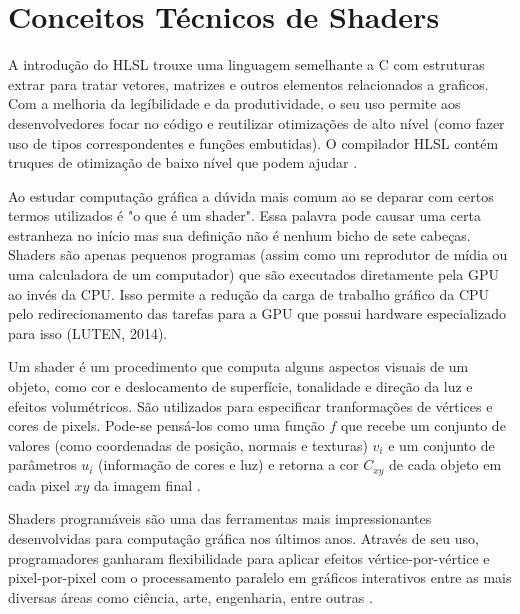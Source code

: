 \section{Conceitos Técnicos de Shaders}
\label{sec:conceitos-tecnicos-shaders}

A introdução do HLSL trouxe uma linguagem semelhante a C com estruturas extrar para tratar vetores, matrizes e outros elementos relacionados a graficos. Com a melhoria da legíbilidade e da produtividade, o seu uso permite aos desenvolvedores focar no código e reutilizar otimizações de alto nível (como fazer uso de tipos correspondentes e funções embutidas). O compilador HLSL contém truques de otimização de baixo nível que podem ajudar \cite{riguer2002performance}.

Ao estudar computação gráfica a dúvida mais comum ao se deparar com certos termos utilizados é "o que é um shader". Essa palavra pode causar uma certa estranheza no início mas sua definição não é nenhum bicho de sete cabeças. Shaders são apenas pequenos programas (assim como um reprodutor de mídia ou uma calculadora de um computador) que são executados diretamente pela \acrshort{GPU} ao invés da \acrshort{CPU}. Isso permite a redução da carga de trabalho gráfico da \acrshort{CPU} pelo redirecionamento das tarefas para a \acrshort{GPU} que possui hardware especializado para isso (LUTEN, 2014)\nocite{openGLBook}.

Um shader é um procedimento que computa alguns aspectos visuais de um objeto, como cor e deslocamento de superfície, tonalidade e direção da luz e efeitos volumétricos. São utilizados para especificar tranformações de vértices e cores de pixels. Pode-se pensá-los como uma função $ f $ que recebe um conjunto de valores (como coordenadas de posição, normais e texturas) $ v_i $ e um conjunto de parâmetros $ u_i $ (informação de cores e luz) e retorna a cor $ C_{xy} $ de cada objeto em cada pixel $ xy $ da imagem final \cite{fabio2005user}. 

Shaders programáveis são uma das ferramentas mais impressionantes desenvolvidas para computação gráfica nos últimos anos. Através de seu uso, programadores ganharam flexibilidade para aplicar efeitos vértice-por-vértice e pixel-por-pixel com o processamento paralelo em gráficos interativos entre as mais diversas áreas como ciência, arte, engenharia, entre outras \cite{bailey2007}.

